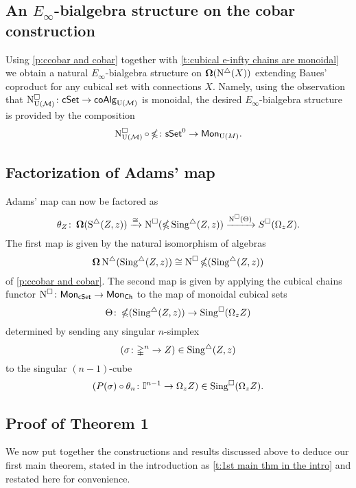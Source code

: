 \subsection{An $E_{\infty}$-bialgebra structure on the cobar construction} \label{ss:e-infty on cobar}

Using \cref{p:ccobar and cobar} together with \cref{t:cubical e-infty chains are monoidal} we obtain a natural $E_{\infty}$-bialgebra structure on $\operatorname{\mathbf{\Omega}}(\operatorname{N^{\triangle}}(X))$ extending Baues' coproduct for any cubical set with connections $X$.
Namely, using the observation that $\operatorname{N^{\square}_{{\operatorname{U}(\mathcal{M})}}} \colon \mathsf{cSet} \to \mathsf{coAlg}_{{\operatorname{U}(\mathcal{M})}}$ is monoidal, the desired $E_{\infty}$-bialgebra structure is provided by the composition 
$$\operatorname{N^{\square}_{{\operatorname{U}(\mathcal{M})}}} \circ \operatorname{\mathbb{\Omega}} \colon \mathsf{sSet}^0 \to \mathsf{Mon}_{\operatorname{U}(M)}.$$

\subsection{Factorization of Adams' map} \label{factorization}

Adams' map can now be factored as 
$$\theta_Z \colon \operatorname{\mathbf{\Omega}}(\operatorname{S^{\triangle}}(Z, z)) \xrightarrow{\cong} 
\operatorname{N^{\square}}(\operatorname{\mathbb{\Omega}} \operatorname{Sing^{\triangle}}(Z, z)) \xrightarrow{\operatorname{N^{\square}}(\Theta)} 
S^{\square}(\Omega_z Z).$$
The first map is given by the natural isomorphism of algebras $$\operatorname{\mathbf{\Omega}} \operatorname{N^{\triangle}} (\operatorname{Sing^{\triangle}}(Z, z)) \cong  \operatorname{N^{\square}} \operatorname{\mathbb{\Omega}} (\operatorname{Sing^{\triangle}}(Z, z))$$ of \cref{p:ccobar and cobar}.
The second map is given by applying the cubical chains functor $\operatorname{N^{\square}} \colon \mathsf{Mon}_{\mathsf{cSet}} \to \mathsf{Mon}_{\mathsf{Ch}}$ to the map of monoidal cubical sets
$$\Theta \colon \operatorname{\mathbb{\Omega}} (\operatorname{Sing^{\triangle}}(Z, z) )\to \operatorname{Sing^{\square}}( \Omega_z Z)$$
determined by sending any singular $n$-simplex $$(\sigma\colon \mathbb{\Delta}^n \to Z) \in \operatorname{Sing^{\triangle}}(Z, z)$$ to the singular $(n-1)$-cube $$(P(\sigma) \circ \theta_n \colon \mathbb{I}^{n-1} \to \Omega_z Z) \in \operatorname{Sing^{\square}}( \Omega_z Z).$$ 

\subsection{Proof of Theorem 1}

We now put together the constructions and results discussed above to deduce our first main theorem, stated in the introduction as \cref{t:1st main thm in the intro} and restated here for convenience.

